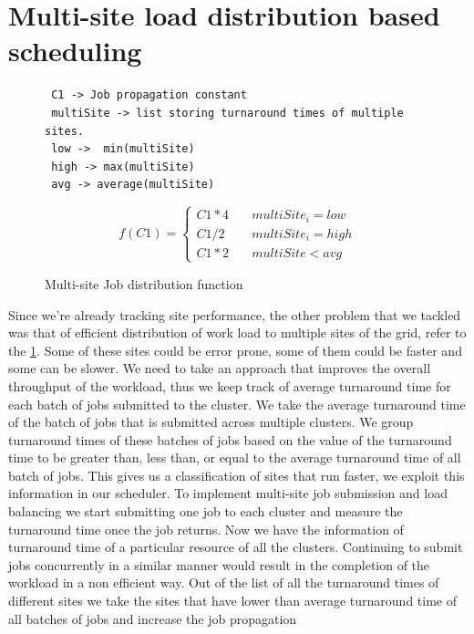 \documentclass[ms,electronic,double]{nuthesis}
\begin{document}
\section{Multi-site load distribution based scheduling} 
 \begin{figure}[htbp!]
   
 \begin{verbatim}
 C1 -> Job propagation constant
 multiSite -> list storing turnaround times of multiple sites.
 low ->  min(multiSite)  
 high -> max(multiSite)
 avg -> average(multiSite)
 \end{verbatim}

$$
f(C1) = \left\{
        \begin{array}{ll}
            C1*4 & \quad multiSite_i = low\\ 
            C1/2 & \quad multiSite_i = high \\
            C1*2 & \quad multiSite < avg
        \end{array}
    \right.
$$

\caption{Multi-site Job distribution function}
  \label{fig:multiSite2}

\end{figure}
Since we're already tracking site performance, the other problem that we tackled was that of efficient distribution of work load to multiple sites of the 
grid, refer to the \ref{fig:multiSite2}.
Some of these sites could be error prone, some of them could be faster and some can be slower. We need to
take an approach that improves the overall throughput of the workload, thus we keep track of average turnaround
 time for each batch of jobs submitted to the cluster. We take the average turnaround time of the batch of jobs that is submitted 
 across multiple clusters. We group turnaround times of these batches of jobs based on the value of the 
 turnaround time to be greater than, less than, or equal to the average turnaround time of all batch of jobs.
 This gives us a classification of sites that run faster, we exploit this information in our scheduler. 
 To implement multi-site job submission and load balancing we start submitting one job to each cluster 
 and measure the turnaround time once the job returns. Now we have the information of turnaround time 
 of a particular resource of all the clusters. Continuing to submit jobs concurrently in a similar manner
  would result in the completion of
 the workload in a non efficient way. Out of the list of all the turnaround times of different sites we take the 
 sites
 that have lower than average turnaround time of all batches of jobs and increase the job propagation 
\end{document}
